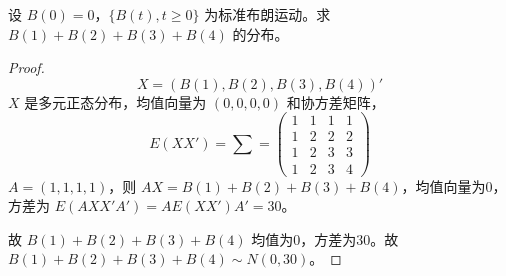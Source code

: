 \documentclass[lang=cn,10pt,thmcnt=section]{elegantbook}
\begin{document}
\begin{example}
	设 $B(0) = 0$，$\{B(t), t \geq 0\}$ 为标准布朗运动。求 $B(1) + B(2) + B(3) + B(4)$ 的分布。
\end{example}
\begin{proof}
	\[
X = (B(1), B(2), B(3), B(4))'
\]
$X$ 是多元正态分布，均值向量为 $(0, 0, 0, 0)$ 和协方差矩阵，
\[
E(XX') = \sum = \begin{pmatrix}
1 & 1 & 1 & 1 \\
1 & 2 & 2 & 2 \\
1 & 2 & 3 & 3 \\
1 & 2 & 3 & 4
\end{pmatrix}
\]
$A = (1, 1, 1, 1)$，则 $AX = B(1) + B(2) + B(3) + B(4)$，均值向量为0，方差为 $E(AXX'A') = AE(XX')A' = 30$。

故 $B(1) + B(2) + B(3) + B(4)$ 均值为0，方差为30。故 $B(1) + B(2) + B(3) + B(4) \sim N(0, 30)$。
\end{proof}
\end{document}
